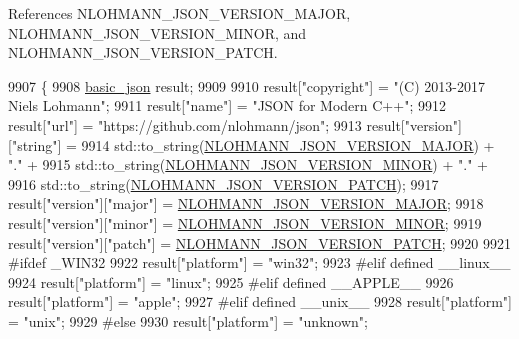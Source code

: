 References N\+L\+O\+H\+M\+A\+N\+N\+\_\+\+J\+S\+O\+N\+\_\+\+V\+E\+R\+S\+I\+O\+N\+\_\+\+M\+A\+J\+OR, N\+L\+O\+H\+M\+A\+N\+N\+\_\+\+J\+S\+O\+N\+\_\+\+V\+E\+R\+S\+I\+O\+N\+\_\+\+M\+I\+N\+OR, and N\+L\+O\+H\+M\+A\+N\+N\+\_\+\+J\+S\+O\+N\+\_\+\+V\+E\+R\+S\+I\+O\+N\+\_\+\+P\+A\+T\+CH.


\begin{DoxyCode}
9907     \{
9908         \hyperlink{classnlohmann_1_1basic__json_aed115142bd0c6c66c864700e0467df55}{basic\_json} result;
9909 
9910         result[\textcolor{stringliteral}{"copyright"}] = \textcolor{stringliteral}{"(C) 2013-2017 Niels Lohmann"};
9911         result[\textcolor{stringliteral}{"name"}] = \textcolor{stringliteral}{"JSON for Modern C++"};
9912         result[\textcolor{stringliteral}{"url"}] = \textcolor{stringliteral}{"https://github.com/nlohmann/json"};
9913         result[\textcolor{stringliteral}{"version"}][\textcolor{stringliteral}{"string"}] =
9914             std::to\_string(\hyperlink{json_8hpp_a7c94253db90041af11dd946a49f0f8a4}{NLOHMANN\_JSON\_VERSION\_MAJOR}) + \textcolor{stringliteral}{"."} +
9915             std::to\_string(\hyperlink{json_8hpp_ab5ca1e164894d78d3276d2e5fe58c5e3}{NLOHMANN\_JSON\_VERSION\_MINOR}) + \textcolor{stringliteral}{"."} +
9916             std::to\_string(\hyperlink{json_8hpp_a307e0238ebc35e99ea45c68823eb83eb}{NLOHMANN\_JSON\_VERSION\_PATCH});
9917         result[\textcolor{stringliteral}{"version"}][\textcolor{stringliteral}{"major"}] = \hyperlink{json_8hpp_a7c94253db90041af11dd946a49f0f8a4}{NLOHMANN\_JSON\_VERSION\_MAJOR};
9918         result[\textcolor{stringliteral}{"version"}][\textcolor{stringliteral}{"minor"}] = \hyperlink{json_8hpp_ab5ca1e164894d78d3276d2e5fe58c5e3}{NLOHMANN\_JSON\_VERSION\_MINOR};
9919         result[\textcolor{stringliteral}{"version"}][\textcolor{stringliteral}{"patch"}] = \hyperlink{json_8hpp_a307e0238ebc35e99ea45c68823eb83eb}{NLOHMANN\_JSON\_VERSION\_PATCH};
9920 
9921 \textcolor{preprocessor}{#ifdef \_WIN32}
9922         result[\textcolor{stringliteral}{"platform"}] = \textcolor{stringliteral}{"win32"};
9923 \textcolor{preprocessor}{#elif defined \_\_linux\_\_}
9924         result[\textcolor{stringliteral}{"platform"}] = \textcolor{stringliteral}{"linux"};
9925 \textcolor{preprocessor}{#elif defined \_\_APPLE\_\_}
9926         result[\textcolor{stringliteral}{"platform"}] = \textcolor{stringliteral}{"apple"};
9927 \textcolor{preprocessor}{#elif defined \_\_unix\_\_}
9928         result[\textcolor{stringliteral}{"platform"}] = \textcolor{stringliteral}{"unix"};
9929 \textcolor{preprocessor}{#else}
9930         result[\textcolor{stringliteral}{"platform"}] = \textcolor{stringliteral}{"unknown"};

\end{DoxyCode}
